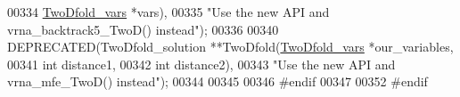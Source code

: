 \begin{DoxyCode}
00334                                        \hyperlink{group__kl__neighborhood__mfe_structTwoDfold__vars}{TwoDfold\_vars}  *vars),
00335           \textcolor{stringliteral}{"Use the new API and vrna\_backtrack5\_TwoD() instead"});
00336 
00340 DEPRECATED(TwoDfold\_solution **TwoDfold(\hyperlink{group__kl__neighborhood__mfe_structTwoDfold__vars}{TwoDfold\_vars} *our\_variables,
00341                                         \textcolor{keywordtype}{int}           distance1,
00342                                         \textcolor{keywordtype}{int}           distance2),
00343           \textcolor{stringliteral}{"Use the new API and vrna\_mfe\_TwoD() instead"});
00344 
00345 
00346 \textcolor{preprocessor}{#endif}
00347 
00352 \textcolor{preprocessor}{#endif}
\end{DoxyCode}

